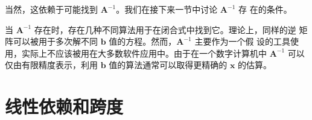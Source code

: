 当然，这依赖于可能找到 $\pmb{A}^{-1}$。我们在接下来一节中讨论 $\pmb{A}^{-1}$ 存
在的条件。

当 $\pmb{A}^{-1}$ 存在时，存在几种不同算法用于在闭合式中找到它。理论上，同样的逆
矩阵可以被用于多次解不同 $\pmb{b}$ 值的方程。然而，$\pmb{A}^{-1}$ 主要作为一个假
设的工具使用，实际上不应该被用在大多数软件应用中。由于在一个数字计算机中
$\pmb{A}^{-1}$ 可以仅由有限精度表示，利用 $\pmb{b}$ 值的算法通常可以取得更精确的
$\pmb{x}$ 的估算。

\section{线性依赖和跨度}
\label{sec:linear_dependence_and_span}
